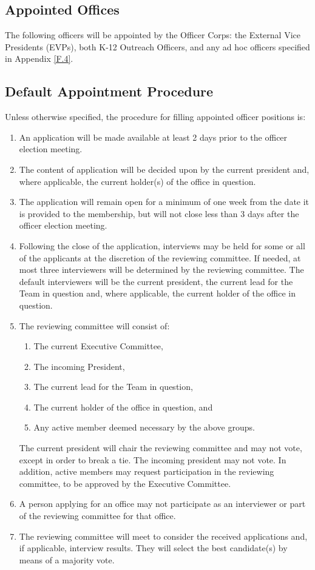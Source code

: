 \subsection{Appointed Offices} \label{IV.1}

The following officers will be appointed by the Officer
Corps: the External Vice Presidents (EVPs), both K-12 Outreach Officers, and any ad
hoc officers specified in Appendix \ref{F.4}.


\subsection{Default Appointment Procedure} \label{IV.2}

Unless otherwise specified, the
procedure for filling appointed officer positions is:
\begin{enumerate}
    \item An application will be made available at least 2 days prior to the officer election
meeting.
    \item The content of application will be decided upon by the current president and, where
applicable, the current holder(s) of the office in question.
    \item The application will remain open for a minimum of one week from the date it is provided
to the membership, but will not close less than 3 days after the officer election
meeting.
    \item Following the close of the application, interviews may be held for some or all of the
applicants at the discretion of the reviewing committee. If needed, at most three interviewers
will be determined by the reviewing committee. The default interviewers
will be the current president, the current lead for the Team in question and, where
applicable, the current holder of the office in question.
    \item The reviewing committee will consist of: \label{IV.2.e}
    \begin{enumerate}
        \item The current Executive Committee,
        \item The incoming President,
        \item The current lead for the Team in question,
        \item The current holder of the office in question, and
        \item Any active member deemed necessary by the above groups.
    \end{enumerate}
    The current president will chair the reviewing committee and may not vote, except
in order to break a tie. The incoming president may not vote. In addition, active
members may request participation in the reviewing committee, to be approved by
the Executive Committee.
    \item A person applying for an office may not participate as an interviewer or part of the
reviewing committee for that office. \label{IV.2.f}
    \item The reviewing committee will meet to consider the received applications and, if applicable,
interview results. They will select the best candidate(s) by means of a majority
vote.
\end{enumerate}


